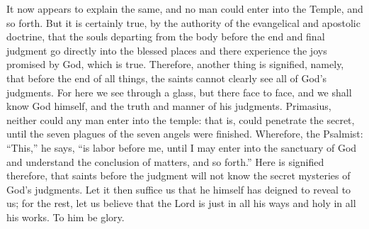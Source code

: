 It now appears to explain the same, and no man could enter into the Temple, and so forth. But it is certainly true, by the authority of the evangelical and apostolic doctrine, that the souls departing from the body before the end and final judgment go directly into the blessed places and there experience the joys promised by God, which is true. Therefore, another thing is signified, namely, that before the end of all things, the saints cannot clearly see all of God’s judgments. For here we see through a glass, but there face to face, and we shall know God himself, and the truth and manner of his judgments. Primasius, neither could any man enter into the temple: that is, could penetrate the secret, until the seven plagues of the seven angels were finished. Wherefore, the Psalmist: “This,” he says, “is labor before me, until I may enter into the sanctuary of God and understand the conclusion of matters, and so forth.” Here is signified therefore, that saints before the judgment will not know the secret mysteries of God’s judgments. Let it then suffice us that he himself has deigned to reveal to us; for the rest, let us believe that the Lord is just in all his ways and holy in all his works. To him be glory.
